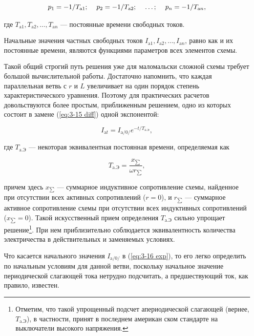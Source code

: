 \begin{equation*}
	p_1 = - 1 / T_{\text{a}1}; \hspace{1pc} p_2 = - 1 / T_{\text{a}2}; \hspace{1pc} \ldots; \hspace{1pc} p_n = - 1 / T_{\text{a}n},
\end{equation*}

где $ T_{\text{a}1}, T_{\text{a}2}, \ldots, T_{\text{a}n} $ --- постоянные времени свободных токов.

Начальные значения частных свободных токов $ I_{\text{a}1}, I_{\text{a}2}, \ldots, I_{\text{a}n} $, равно как и их постоянные времени, являются функциями параметров всех элементов схемы.

Такой общий строгий путь решения уже для маломальски сложной схемы требует большой вычислительной работы. Достаточно напомнить, что каждая параллельная ветвь с $ r $ и $ L $ увеличивает на один порядок степень характеристического уравнения. Поэтому для практических расчетов довольствуются более простым, приближенным решением, одно из которых состоит в замене (\ref{eq:3-15 diff}) одной экспонентой:

\begin{equation}
	I_{\text{a}t} = I_{\text{a/0/}}e^{-t/T_{\text{a.Э}}},
	\label{eq:3-16 exp}
\end{equation}

где $ T_{\text{a.Э}} $ --- некоторая эквивалентная постоянная времени, определяемая как

\begin{equation}
	T_{\text{a.Э}} = \frac{x_{\sum}}{\omega r_{\sum}},
	\label{eq:3-17 T_a}
\end{equation}

причем здесь $ x_{\sum} $ --- суммарное индуктивное сопротивление схемы, найденное при отсутствии всех активных сопротивлений ($ r = 0 $), и $ r_{\sum} $ --- суммарное активное сопротивление схемы при отсутствии всех индуктивных сопротивлений ($ x_{\sum} = 0 $). Такой искусственный прием определения $ T_{\text{a.Э}} $ сильно упрощает решение\footnote{Отметим, что такой упрощенный подсчет апериодической слагающей (вернее, $ T_{\text{a.Э}} $), в частности, принят в последнем американ	ском стандарте на выключатели высокого напряжения.}. При нем приблизительно соблюдается эквивалентность количества электричества в действительных и заменяемых условиях.

Что касается начального значения $ I_{\text{a/0/}} $ в (\ref{eq:3-16 exp}), то его легко определить по начальным условиям для данной ветви, поскольку начальное значение периодической слагающей тока нетрудно подсчитать, а предшествующий ток, как правило, известен.

